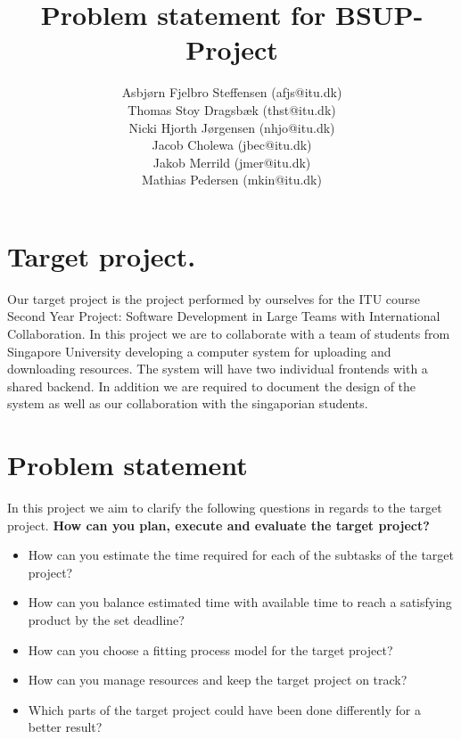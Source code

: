 \documentclass[]{article}
\title{Problem statement for BSUP-Project}
\author{Asbj\o rn Fjelbro Steffensen (afjs@itu.dk)\\ Thomas Stoy Dragsb\ae k (thst@itu.dk)\\ Nicki Hjorth J\o rgensen (nhjo@itu.dk)\\ Jacob Cholewa (jbec@itu.dk)\\ Jakob Merrild (jmer@itu.dk)\\ Mathias Pedersen (mkin@itu.dk)}
\begin{document}
\maketitle

\section*{Target project.}
Our target project is the project performed by ourselves for the ITU course 
Second Year Project: Software Development in Large Teams with International Collaboration.
In this project we are to collaborate with a team of students from Singapore University
developing a computer system for uploading and downloading resources. The system will have two
individual frontends with a shared backend. In addition we are required to document the design
of the system as well as our collaboration with the singaporian students.

\section*{Problem statement}
In this project we aim to clarify the following questions in regards to the target project.	
\textbf{How can you plan, execute and evaluate the target project?}
\begin{itemize}
	\item	How can you estimate the time required for each of the subtasks of the target project?
	\item 	How can you balance estimated time with available time to reach a satisfying product by the set deadline?
	\item 	How can you choose a fitting process model for the target project?
	\item 	How can you manage resources and keep the target project on track?
	\item 	Which parts of the target project could have been done differently for a better result?
\end{itemize}
\end{document}
